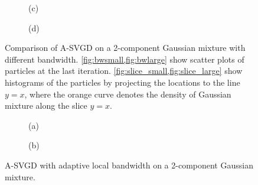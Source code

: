 \begin{figure}[t!]
\begin{subfigure}[b]{0.48\textwidth}
    \caption{(c)\label{fig:slice_small}}
\end{subfigure}
\hfill
\centering
\begin{subfigure}[b]{0.48\textwidth}
    \caption{(d)\label{fig:slice_large}}
\end{subfigure}


\caption{Comparison of A-SVGD on a 2-component Gaussian mixture with different bandwidth. \cref{fig:bwsmall,fig:bwlarge} show scatter plots of particles at the last iteration. \cref{fig:slice_small,fig:slice_large} show histograms of the particles by projecting the locations to the line $y = x$, where the orange curve denotes the density of Gaussian mixture along the slice $y = x$.}
\label{fig:differentBW}
\end{figure}


\begin{figure}[t!]
    
\end{figure}


\captionsetup[subfigure]{labelformat=empty}
\begin{figure}[t!]
    \centering 
\begin{subfigure}[b]{.48\textwidth} 
    \caption{(a) \label{fig:bwlocal}}
\end{subfigure}
\hfill
\centering
\begin{subfigure}[b]{0.48\textwidth}
    \caption{(b)\label{fig:slicelocal}}
\end{subfigure}

\caption{A-SVGD with adaptive local bandwidth on a 2-component Gaussian mixture.}
\label{fig:localbw}
\end{figure}


